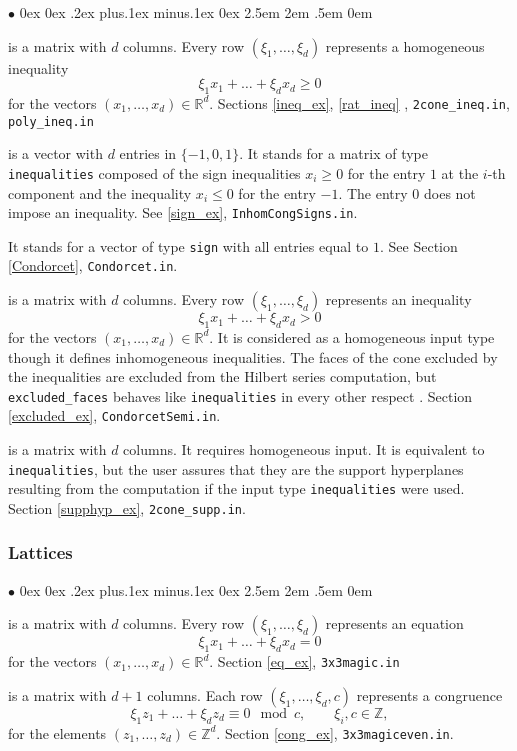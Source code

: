 \documentclass[12pt,a4paper]{scrartcl}
\newcommand{\stdli}{ \topsep0ex \partopsep0ex %
\parsep.2ex plus.1ex minus.1ex \itemsep0ex%
\leftmargin2.5em \labelwidth2em \labelsep.5em \rightmargin0em}%
\renewenvironment{itemize}{\begin{list}{{$\bullet$}}{\stdli}}{\end{list}}
\theoremstyle{definition}
\def\ZZ{{\mathbb Z}}
\def\RR{{\mathbb R}}
\def\itemtt[#1]{\item[\textbf{\ttt{#1}}]}
\def\ttt{\texttt}
\begin{document}
\begin{itemize}
	\itemtt[inequalities] is a matrix with $d$ columns. Every row $(\xi_1,\dots,\xi_d)$ represents a homogeneous inequality
	$$
	\xi_1x_1+\dots+\xi_dx_d\ge 0
	$$
	for the vectors $(x_1,\dots,x_d)\in\RR^d$. Sections \ref{ineq_ex}, \ref{rat_ineq} , \verb|2cone_ineq.in|, \verb|poly_ineq.in|
	
	\itemtt[signs] is a vector with $d$ entries in $\{-1,0,1\}$.
	It stands for a matrix of type \verb|inequalities| composed of the sign inequalities $x_i\ge 0$ for the entry $1$ at the $i$-th component and the inequality $x_i\le 0$ for the entry $-1$. The entry $0$ does not impose an inequality. See \ref{sign_ex}, \verb|InhomCongSigns.in|.
	
	\itemtt[nonnegative] It stands for a vector of type \verb|sign| with all entries equal to $1$. See Section \ref{Condorcet}, \verb|Condorcet.in|.
	
	\itemtt[excluded\_faces]  is a matrix with $d$ columns. Every row $(\xi_1,\dots,\xi_d)$ represents an inequality
	$$
	\xi_1x_1+\dots+\xi_dx_d> 0
	$$
	for the vectors $(x_1,\dots,x_d)\in\RR^d$. It is considered as a homogeneous input type though it defines inhomogeneous inequalities. The faces of the cone excluded by the inequalities are excluded from the Hilbert series computation, but \verb|excluded_faces| behaves like \verb|inequalities| in every other respect . 
	Section \ref{excluded_ex}, \verb|CondorcetSemi.in|.
	
	\itemtt[support\_hyperplanes] is a matrix with $d$ columns. It requires homogeneous input. It is  equivalent to \ttt{inequalities}, but the user assures that they are the support hyperplanes resulting from the computation if the input type \ttt{inequalities} were used. Section \ref{supphyp_ex}, \verb|2cone_supp.in|.
\end{itemize}

\subsubsection{Lattices}

\begin{itemize}
	\itemtt[equations] is a matrix with $d$ columns. Every row $(\xi_1,\dots,\xi_d)$ represents an equation
	$$
	\xi_1x_1+\dots+\xi_dx_d= 0
	$$
	for the vectors $(x_1,\dots,x_d)\in\RR^d$. Section \ref{eq_ex}, \verb|3x3magic.in|
	
	\itemtt[congruences] is a matrix with $d+1$ columns. Each row $(\xi_1,\dots,\xi_d,c)$ represents a congruence
	$$
	\xi_1z_1+\dots+\xi_dz_d\equiv 0 \mod c, \qquad \xi_i,c\in\ZZ,
	$$
	for the elements $(z_1,\dots,z_d)\in\ZZ^d$. Section \ref{cong_ex}, \verb|3x3magiceven.in|.
\end{itemize}
\end{document}
